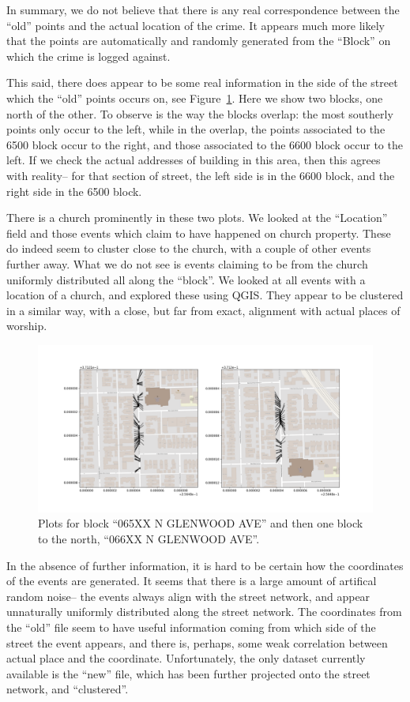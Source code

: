 \documentclass[twoside,a4paper,twocolumn,10pt]{article}
\theoremstyle{plain}
\theoremstyle{definition}
\begin{document}
In summary, we do not believe that there is any real correspondence between the ``old'' points
and the actual location of the crime.  It appears much more likely that the points are
automatically and randomly generated from the ``Block'' on which the crime is logged against.

This said, there does appear to be some real information in the side of the street which the
``old'' points occurs on, see Figure~\ref{fig:four}.  Here we show two blocks, one north
of the other.  To observe is the way the blocks overlap: the most southerly points only
occur to the left, while in the overlap, the points associated to the 6500 block occur
to the right, and those associated to the 6600 block occur to the left.
If we check the actual addresses of building in this area, then this agrees with
reality-- for that section of street, the left side is in the 6600 block, and the right
side in the 6500 block.

There is a church prominently in these two plots.  We looked at the ``Location'' field
and those events which claim to have happened on church property.  These do indeed seem
to cluster close to the church, with a couple of other events further away.  What we
do not see is events claiming to be from the church uniformly distributed all along
the ``block''.  We looked at all events with a location of a church, and explored these
using QGIS.  They appear to be clustered in a similar way, with a close, but far from
exact, alignment with actual places of worship.

\begin{figure}
  \includegraphics[width=\textwidth]{Chicago_example2.png}
  \caption{Plots for block ``065XX N GLENWOOD AVE'' and then one block to the north,
``066XX N GLENWOOD AVE''.}
  \label{fig:four}
\end{figure}

In the absence of further information, it is hard to be certain how the coordinates of
the events are generated.  It seems that there is a large amount of artifical random
noise-- the events always align with the street network, and appear unnaturally uniformly
distributed along the street network.  The coordinates from the ``old'' file seem to
have useful information coming from which side of the street the event appears, and
there is, perhaps, some weak correlation between actual place and the coordinate.
Unfortunately, the only dataset currently available is the ``new'' file, which has
been further projected onto the street network, and ``clustered''.
\end{document}
